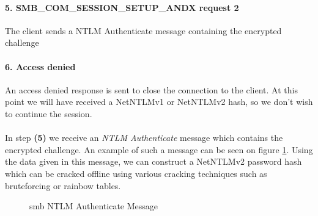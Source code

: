 \documentclass{article}
\begin{document}
\paragraph{5. SMB\_COM\_SESSION\_SETUP\_ANDX request 2} The client sends a NTLM Authenticate message containing the encrypted challenge
\paragraph{6. Access denied} An access denied response is sent to close the connection to the client. At this point we will have received a NetNTLMv1 or NetNTLMv2 hash, so we don't wish to continue the session.
\\\\
In step \textbf{(5)} we receive an \emph{NTLM Authenticate} message which contains the encrypted challenge. An example of such a message can be seen on figure \ref{fig:smb-ntlm-authenticate}. Using the data given in this message, we can construct a NetNTLMv2 password hash which can be cracked offline using various cracking techniques such as bruteforcing or rainbow tables.

\begin{figure}[H]
	\scriptsize
	\par
	\centering
	\varwidth{\linewidth}
	
	\endvarwidth
    \par
    
    \caption{\gls{smb} NTLM Authenticate Message}
    \label{fig:smb-ntlm-authenticate}
\end{figure}

\end{document}
